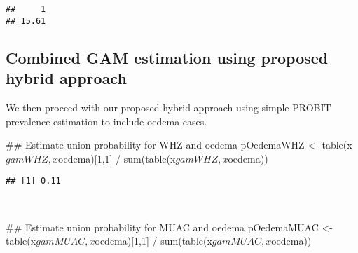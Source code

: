\documentclass[12pt,a4paper]{article}
\newenvironment{Shaded}{}{}
\newcommand{\CommentTok}[1]{\textcolor[rgb]{0.00,0.50,0.00}{#1}}
\newcommand{\DecValTok}[1]{#1}
\newcommand{\KeywordTok}[1]{\textcolor[rgb]{0.00,0.00,1.00}{#1}}
\newcommand{\NormalTok}[1]{#1}
\newcommand{\OperatorTok}[1]{#1}
\newcommand{\StringTok}[1]{\textcolor[rgb]{0.00,0.50,0.50}{#1}}
\begin{document}
\begin{verbatim}
##     1 
## 15.61
\end{verbatim}

\hypertarget{combined-gam-estimation-using-proposed-hybrid-approach-1}{%
\subsection{Combined GAM estimation using proposed hybrid approach}\label{combined-gam-estimation-using-proposed-hybrid-approach-1}}

We then proceed with our proposed hybrid approach using simple PROBIT prevalence estimation to include oedema cases.

\begin{Shaded}
\end{Shaded}

\begin{Shaded}
\begin{Highlighting}[]
\CommentTok{## Estimate union probability for WHZ and oedema}
\NormalTok{pOedemaWHZ <-}\StringTok{ }\KeywordTok{table}\NormalTok{(x}\OperatorTok{$}\NormalTok{gamWHZ, x}\OperatorTok{$}\NormalTok{oedema)[}\DecValTok{1}\NormalTok{,}\DecValTok{1}\NormalTok{] }\OperatorTok{/}\StringTok{ }\KeywordTok{sum}\NormalTok{(}\KeywordTok{table}\NormalTok{(x}\OperatorTok{$}\NormalTok{gamWHZ, x}\OperatorTok{$}\NormalTok{oedema))}
\end{Highlighting}
\end{Shaded}

\begin{verbatim}
## [1] 0.11
\end{verbatim}

~

\begin{Shaded}
\begin{Highlighting}[]
\CommentTok{## Estimate union probability for MUAC and oedema}
\NormalTok{pOedemaMUAC <-}\StringTok{ }\KeywordTok{table}\NormalTok{(x}\OperatorTok{$}\NormalTok{gamMUAC, x}\OperatorTok{$}\NormalTok{oedema)[}\DecValTok{1}\NormalTok{,}\DecValTok{1}\NormalTok{] }\OperatorTok{/}\StringTok{ }\KeywordTok{sum}\NormalTok{(}\KeywordTok{table}\NormalTok{(x}\OperatorTok{$}\NormalTok{gamMUAC, x}\OperatorTok{$}\NormalTok{oedema))}
\end{Highlighting}
\end{Shaded}
\end{document}
